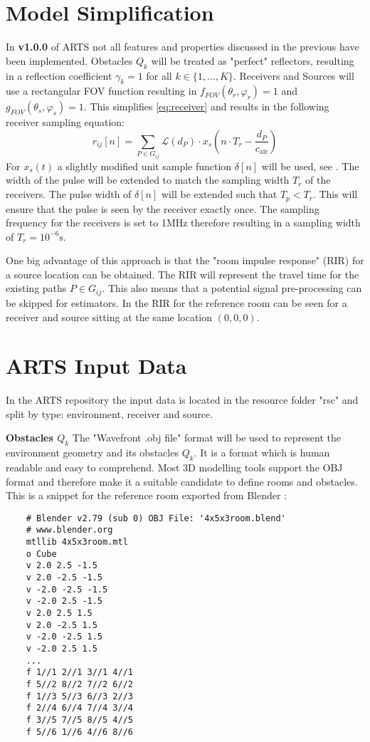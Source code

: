 \section{Model Simplification}\label{sec:modelSimplification}
In \textbf{v1.0.0} of ARTS not all features and properties discussed in the previous  have been implemented.\newline
Obstacles $Q_k$ will be treated as "perfect" reflectors, resulting in a reflection coefficient $\gamma_k = 1$ for all $k \in \{1,...,K\}$.
Receivers and Sources will use a rectangular FOV function resulting in $f_{FOV}(\theta_r, \varphi_r) = 1$ and $g_{FOV}(\theta_s, \varphi_s) = 1$.
This simplifies \eqref{eq:receiver} and results in the following receiver sampling equation:
\begin{equation}
    r_{ij}[n] = \sum_{P \in G_{ij}} \mathcal{L}(d_P) \cdot x_s(n \cdot T_r - \frac{d_P}{c_{\text{air}}})
\end{equation}
For $x_s(t)$ a slightly modified unit sample function $\delta[n]$ will be used, see .
The width of the pulse will be extended to match the sampling width $T_r$ of the receivers.
The pulse width of $\delta[n]$ will be extended such that $T_p < T_r$.
This will ensure that the pulse is seen by the receiver exactly once.
The sampling frequency for the receivers is set to 1MHz therefore resulting in a sampling width of $T_r = 10^{-6}\text{s}$.

One big advantage of this approach is that the "room impulse response" (RIR) for a source location can be obtained.
The RIR will represent the travel time for the existing paths $P \in G_{ij}$.
This also means that a potential signal pre-processing can be skipped for estimators. In  the RIR for the reference room can be seen for a receiver and source sitting at the same location $(0,0,0)$.


\section{ARTS Input Data}
In the ARTS repository the input data is located in the resource folder "rsc" and split by type: environment, receiver and source.

\textbf{Obstacles $Q_k$}\newline
The "Wavefront .obj file" format \cite{mreddy} will be used to represent the environment geometry and its obstacles $Q_k$. 
It is a format which is human readable and easy to comprehend. 
Most 3D modelling tools support the OBJ format and therefore make it a suitable candidate to define rooms and obstacles. 
This is a snippet for the reference room exported from Blender \cite{blender}:
\begin{verbatim}
    # Blender v2.79 (sub 0) OBJ File: '4x5x3room.blend'
    # www.blender.org
    mtllib 4x5x3room.mtl
    o Cube
    v 2.0 2.5 -1.5
    v 2.0 -2.5 -1.5
    v -2.0 -2.5 -1.5
    v -2.0 2.5 -1.5
    v 2.0 2.5 1.5
    v 2.0 -2.5 1.5
    v -2.0 -2.5 1.5
    v -2.0 2.5 1.5
    ...
    f 1//1 2//1 3//1 4//1
    f 5//2 8//2 7//2 6//2
    f 1//3 5//3 6//3 2//3
    f 2//4 6//4 7//4 3//4
    f 3//5 7//5 8//5 4//5
    f 5//6 1//6 4//6 8//6
\end{verbatim}

